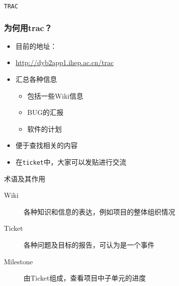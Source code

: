 
\begin{frame}
    \begin{center}
        \LARGE \tt{TRAC}
    \end{center}
\end{frame}

\begin{frame}
    \frametitle{为何用trac？}
    \begin{itemize}    
        \item 目前的地址：
        \item \url{http://dyb2app1.ihep.ac.cn/trac}
        \item 汇总各种信息
            \begin{itemize}
                \item 包括一些Wiki信息
                \item BUG的汇报
                \item 软件的计划
            \end{itemize}
        \item 便于查找相关的内容
        \item 在{\tt ticket}中，大家可以发贴进行交流
    \end{itemize}
    \begin{block}{术语及其作用}
        \begin{description}
            \item[Wiki] 各种知识和信息的表达，例如项目的整体组织情况
            \item[Ticket] 各种问题及目标的报告，可认为是一个事件
            \item[Milestone] 由Ticket组成，查看项目中子单元的进度
        \end{description}
    \end{block}
\end{frame}

